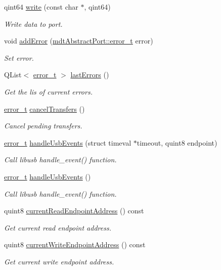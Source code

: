 \begin{DoxyCompactItemize}
qint64 \hyperlink{classmdt_usb_port_ae777e33325ff2adef326dd7f81b00838}{write} (const char $\ast$, qint64)
\begin{DoxyCompactList}\small\item\em Write data to port. \end{DoxyCompactList}\item 
void \hyperlink{classmdt_usb_port_aa857e94b4167c53b26573042ee3af280}{addError} (\hyperlink{classmdt_abstract_port_ad4121bb930c95887e77f8bafa065a85e}{mdtAbstractPort::error\_\-t} error)
\begin{DoxyCompactList}\small\item\em Set error. \end{DoxyCompactList}\item 
QList$<$ \hyperlink{classmdt_abstract_port_ad4121bb930c95887e77f8bafa065a85e}{error\_\-t} $>$ \hyperlink{classmdt_usb_port_a81855cebd9b672a74d836955236c19bf}{lastErrors} ()
\begin{DoxyCompactList}\small\item\em Get the lis of current errors. \end{DoxyCompactList}\item 
\hyperlink{classmdt_abstract_port_ad4121bb930c95887e77f8bafa065a85e}{error\_\-t} \hyperlink{classmdt_usb_port_afe5b473e1df8b828c17f83a45a3902fb}{cancelTransfers} ()
\begin{DoxyCompactList}\small\item\em Cancel pending transfers. \end{DoxyCompactList}\item 
\hyperlink{classmdt_abstract_port_ad4121bb930c95887e77f8bafa065a85e}{error\_\-t} \hyperlink{classmdt_usb_port_a551748422808cbb071930e1134bfaad5}{handleUsbEvents} (struct timeval $\ast$timeout, quint8 endpoint)
\begin{DoxyCompactList}\small\item\em Call libusb handle\_\-event() function. \end{DoxyCompactList}\item 
\hyperlink{classmdt_abstract_port_ad4121bb930c95887e77f8bafa065a85e}{error\_\-t} \hyperlink{classmdt_usb_port_abb66e85fc1366112eeb0a6e86f6e7e32}{handleUsbEvents} ()
\begin{DoxyCompactList}\small\item\em Call libusb handle\_\-event() function. \end{DoxyCompactList}\item 
quint8 \hyperlink{classmdt_usb_port_a860e89069ba433e6174c032a28d0eae2}{currentReadEndpointAddress} () const 
\begin{DoxyCompactList}\small\item\em Get current read endpoint address. \end{DoxyCompactList}\item 
quint8 \hyperlink{classmdt_usb_port_ae2319ee6ff5a2f4399410175fbac6a44}{currentWriteEndpointAddress} () const 
\begin{DoxyCompactList}\small\item\em Get current write endpoint address. \end{DoxyCompactList}\end{DoxyCompactItemize}
